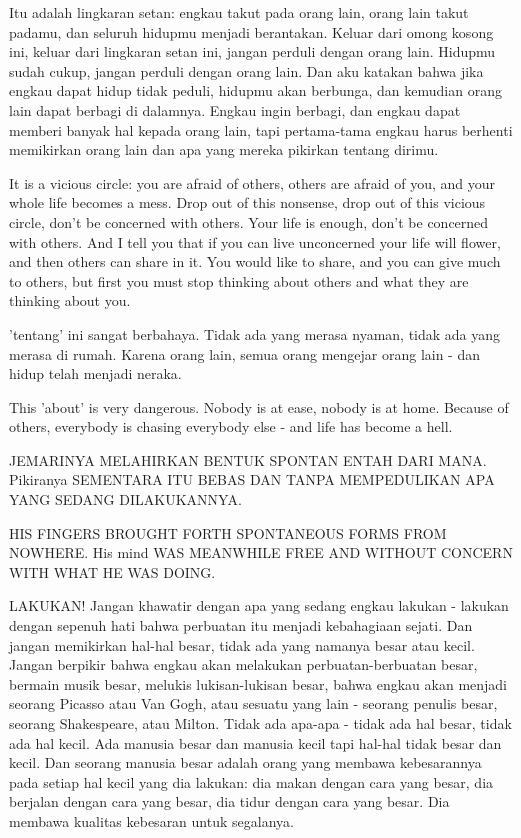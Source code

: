 \bahasa
Itu adalah lingkaran setan: engkau takut pada orang lain, orang lain takut padamu, dan seluruh hidupmu menjadi berantakan. Keluar dari omong kosong ini, keluar dari lingkaran setan ini, jangan perduli dengan orang lain. Hidupmu sudah cukup, jangan perduli dengan orang lain. Dan aku katakan bahwa jika engkau dapat hidup tidak peduli, hidupmu akan berbunga, dan kemudian orang lain dapat berbagi di dalamnya. Engkau ingin berbagi, dan engkau dapat memberi banyak hal kepada orang lain, tapi pertama-tama engkau harus berhenti memikirkan orang lain dan apa yang mereka pikirkan tentang dirimu.

\english
It is a vicious circle: you are afraid of others, others are afraid of you, and your whole life becomes a mess. Drop out of this nonsense, drop out of this vicious circle, don't be concerned with others. Your life is enough, don't be concerned with others. And I tell you that if you can live unconcerned your life will flower, and then others can share in it. You would like to share, and you can give much to others, but first you must stop thinking about others and what they are thinking about you.

\bahasa
'tentang' ini sangat berbahaya. Tidak ada yang merasa nyaman, tidak ada yang merasa di rumah. Karena orang lain, semua orang mengejar orang lain - dan hidup telah menjadi neraka.

\english
This 'about' is very dangerous. Nobody is at ease, nobody is at home. Because of others, everybody is chasing everybody else - and life has become a hell.

\bahasa
JEMARINYA MELAHIRKAN BENTUK SPONTAN ENTAH DARI MANA. Pikiranya SEMENTARA ITU BEBAS DAN TANPA MEMPEDULIKAN APA YANG SEDANG DILAKUKANNYA.

\english
HIS FINGERS BROUGHT FORTH SPONTANEOUS FORMS FROM NOWHERE. His mind WAS MEANWHILE FREE AND WITHOUT CONCERN WITH WHAT HE WAS DOING.

\bahasa
LAKUKAN! Jangan khawatir dengan apa yang sedang engkau lakukan - lakukan dengan sepenuh hati bahwa perbuatan itu menjadi kebahagiaan sejati. Dan jangan memikirkan hal-hal besar, tidak ada yang namanya besar atau kecil. Jangan berpikir bahwa engkau akan melakukan perbuatan-berbuatan besar, bermain musik besar, melukis lukisan-lukisan besar, bahwa engkau akan menjadi seorang Picasso atau Van Gogh, atau sesuatu yang lain - seorang penulis besar, seorang Shakespeare, atau Milton. Tidak ada apa-apa - tidak ada hal besar, tidak ada hal kecil. Ada manusia besar dan manusia kecil tapi hal-hal tidak besar dan kecil. Dan seorang manusia besar adalah orang yang membawa kebesarannya pada setiap hal kecil yang dia lakukan: dia makan dengan cara yang besar, dia berjalan dengan cara yang besar, dia tidur dengan cara yang besar. Dia membawa kualitas kebesaran untuk segalanya.

